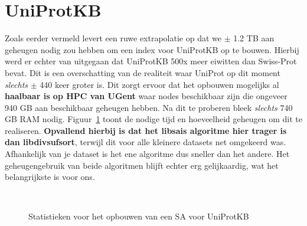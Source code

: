 \section{UniProtKB}\label{sec:uniprotkb}
Zoals eerder vermeld levert een ruwe extrapolatie op dat we $\pm$ 1.2 TB aan geheugen nodig zou hebben om een index voor UniProtKB op te bouwen.
Hierbij werd er echter van uitgegaan dat UniProtKB 500x meer eiwitten dan Swiss-Prot bevat.
Dit is een overschatting van de realiteit waar UniProt op dit moment \textit{slechts} $\pm$ 440 keer groter is.
Dit zorgt ervoor dat het opbouwen mogelijks al \textbf{haalbaar is op HPC van UGent} waar nodes beschikbaar zijn die ongeveer 940 GB aan beschikbaar geheugen hebben.
Na dit te proberen bleek \textit{slechts} 740 GB RAM nodig.
Figuur~\ref{fig:build_uniprot} toont de nodige tijd en hoeveelheid geheugen om dit te realiseren.
\textbf{Opvallend hierbij is dat het libsais algoritme hier trager is dan libdivsufsort}, terwijl dit voor alle kleinere datasets net omgekeerd was.
Afhankelijk van je dataset is het ene algoritme dus sneller dan het andere.
Het geheugengebruik van beide algoritmen blijft echter erg gelijkaardig, wat het belangrijkste is voor ons.
\\
\begin{figure}[H]
    \centering
    \\[4ex] %

    \caption{Statistieken voor het opbouwen van een SA voor UniProtKB}\label{fig:build_uniprot}
\end{figure}

